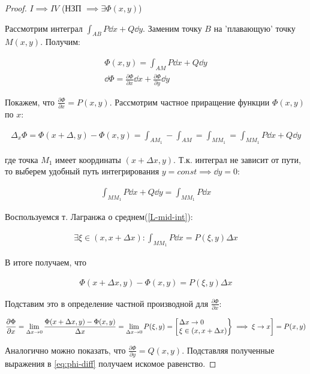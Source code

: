 \begin{proof}
  \(I \implies IV\) (НЗП \(\implies \exists \Phi(x, y)\))

  Рассмотрим интеграл \(\int_{AB} P \dd x + Q \dd y\).
  Заменим точку \(B\) на 'плавающую' точку \(M(x, y)\). Получим:

  \begin{align*}
    \Phi(x, y) = \int_{AM} P \dd x + Q \dd y \\
    \dd \Phi
    = \frac{\partial \Phi}{\partial x} \dd x
      + \frac{\partial \Phi}{\partial y} \dd y
    \label{eq:phi-diff}\tag{1}
  \end{align*}

  Покажем, что \(\displaystyle \frac{\partial \Phi}{\partial x} = P(x, y)\).
  Рассмотрим частное приращение функции \(\Phi(x, y)\) по \(x\):

  \begin{align*}
    \Delta_{x} \Phi
    = \Phi(x + \Delta, y) - \Phi(x, y)
    = \int_{AM_{1}} - \int_{AM}
    = \int_{MM_{1}}
    = \int_{MM_{1}} P \dd x + Q \dd y
  \end{align*}

  где точка \(M_{1}\) имеет координаты \((x + \Delta x, y)\). Т.к. интеграл не
  зависит от пути, то выберем удобный путь интегрирования
  \(y = const \implies \dd y = 0\):

  \begin{align*}
    \int_{MM_{1}} P \dd x + Q \dd y
    = \int_{MM_{1}} P \dd x
  \end{align*}

  Воспользуемся т. Лагранжа о среднем(\ref{L-mid-int}):

  \begin{align*}
    \exists \xi \in (x, x + \Delta x) \colon 
      \int_{MM_{1}} P \dd x = P(\xi, y) \Delta x    
  \end{align*}

  В итоге получаем, что
  
  \begin{align*}
    \Phi(x + \Delta x, y) - \Phi(x, y) = P(\xi, y) \Delta x
  \end{align*}

  Подставим это в определение частной производной  для
  \(\displaystyle \frac{\partial \Phi}{\partial x}\):

  \begin{align*}
    \frac{\partial \Phi}{\partial x}
    = \lim_{\Delta x \to 0}
      \frac{\Phi(x + \Delta x, y) - \Phi(x, y)}{\Delta x}
    = \lim_{\Delta x \to 0} P(\xi, y)
    = \begin{bmatrix}
      \begin{rcases}
        \Delta x \to 0 \\
        \xi \in (x, x + \Delta x)
      \end{rcases}
      \implies \xi \to x
    \end{bmatrix}
    = P(x, y)
  \end{align*}

  Аналогично можно показать, что
  \(\displaystyle \frac{\partial \Phi}{\partial y} = Q(x, y)\).
  Подставляя полученные выражения в \eqref{eq:phi-diff} получаем искомое
  равенство.
\end{proof}
